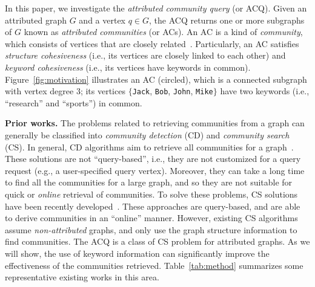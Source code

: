 In this paper, we investigate the {\it attributed community query} (or ACQ). Given an attributed graph $G$ and a vertex $q \in G$, the ACQ returns one or more subgraphs of $G$ known as {\it attributed communities} (or ACs).  An AC is a kind of {\it community}, which consists of vertices that are closely related~\cite{KDD2010,local2014,online-sigmod2013,k-truss2014,community-phy2004,community-phy2010}.  Particularly, an AC satisfies {\it structure cohesiveness} (i.e., its vertices are closely linked to each other) and {\it keyword cohesiveness} (i.e., its vertices have keywords in common). Figure~\ref{fig:motivation} illustrates an AC (circled), which is a connected subgraph with vertex degree 3; its vertices $\{${\tt Jack}, {\tt Bob}, {\tt John}, {\tt Mike}$\}$ have two keywords (i.e., ``research'' and ``sports'') in common.

{\bf Prior works.} %
The problems related to retrieving communities from a graph can generally be classified into {\it community detection} (CD) and {\it community search} (CS).  In general, CD algorithms aim to retrieve all communities for a graph~\cite{community-phy2004,community-phy2010,attr-vldb2009,attr-topic-kdd2008,attr-topic-icml2009,attr-topic-sigmod2012,attr-www2013,yang2013community}. These solutions are not ``query-based'', i.e., they are not customized for a query request (e.g., a user-specified query vertex).
Moreover, they can take a long time to find all the communities for a large graph, and so they are not suitable for quick or {\it online} retrieval of communities. To solve these problems, CS solutions have been recently developed~\cite{KDD2010,local2014,online-sigmod2013,k-truss2014,huang2015approximate,barbieri2015efficient}. These approaches are query-based, and are able to derive communities in an ``online'' manner. However, existing CS algorithms assume {\it non-attributed} graphs, and only use the graph structure information to find communities. The ACQ is a class of CS problem for attributed graphs. As we will show, the use of keyword information can significantly improve the effectiveness of the communities retrieved. Table~\ref{tab:method} summarizes some representative existing works in this area.

